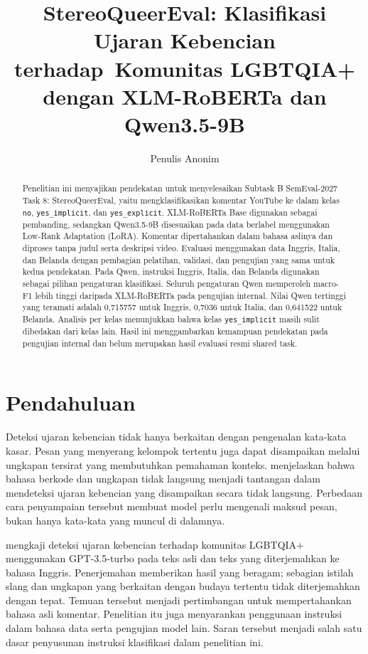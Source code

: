 \documentclass[11pt]{article}
\title{StereoQueerEval: Klasifikasi Ujaran Kebencian terhadap\
Komunitas LGBTQIA+ dengan XLM-RoBERTa dan Qwen3.5-9B}
\author{Penulis Anonim}
\begin{document}
\maketitle
\begin{abstract}
Penelitian ini menyajikan pendekatan untuk menyelesaikan Subtask B SemEval-2027 Task 8: StereoQueerEval, yaitu mengklasifikasikan komentar YouTube ke dalam kelas \texttt{no}, \texttt{yes\_implicit}, dan \texttt{yes\_explicit}. XLM-RoBERTa Base digunakan sebagai pembanding, sedangkan Qwen3.5-9B disesuaikan pada data berlabel menggunakan Low-Rank Adaptation (LoRA). Komentar dipertahankan dalam bahasa aslinya dan diproses tanpa judul serta deskripsi video. Evaluasi menggunakan data Inggris, Italia, dan Belanda dengan pembagian pelatihan, validasi, dan pengujian yang sama untuk kedua pendekatan. Pada Qwen, instruksi Inggris, Italia, dan Belanda digunakan sebagai pilihan pengaturan klasifikasi. Seluruh pengaturan Qwen memperoleh macro-F1 lebih tinggi daripada XLM-RoBERTa pada pengujian internal. Nilai Qwen tertinggi yang teramati adalah 0,715757 untuk Inggris, 0,7036 untuk Italia, dan 0,641522 untuk Belanda. Analisis per kelas menunjukkan bahwa kelas \texttt{yes\_implicit} masih sulit dibedakan dari kelas lain. Hasil ini menggambarkan kemampuan pendekatan pada pengujian internal dan belum merupakan hasil evaluasi resmi shared task.
\end{abstract}

\section{Pendahuluan}
\label{sec:pendahuluan}
Deteksi ujaran kebencian tidak hanya berkaitan dengan pengenalan kata-kata kasar. Pesan yang menyerang kelompok tertentu juga dapat disampaikan melalui ungkapan tersirat yang membutuhkan pemahaman konteks. \citet{elsherief-etal-2021-latent} menjelaskan bahwa bahasa berkode dan ungkapan tidak langsung menjadi tantangan dalam mendeteksi ujaran kebencian yang disampaikan secara tidak langsung. Perbedaan cara penyampaian tersebut membuat model perlu mengenali maksud pesan, bukan hanya kata-kata yang muncul di dalamnya.

\citet{chan-etal-2024-hate} mengkaji deteksi ujaran kebencian terhadap komunitas LGBTQIA+ menggunakan GPT-3.5-turbo pada teks asli dan teks yang diterjemahkan ke bahasa Inggris. Penerjemahan memberikan hasil yang beragam; sebagian istilah slang dan ungkapan yang berkaitan dengan budaya tertentu tidak diterjemahkan dengan tepat. Temuan tersebut menjadi pertimbangan untuk mempertahankan bahasa asli komentar. Penelitian itu juga menyarankan penggunaan instruksi dalam bahasa data serta pengujian model lain. Saran tersebut menjadi salah satu dasar penyusunan instruksi klasifikasi dalam penelitian ini.
\end{document}
